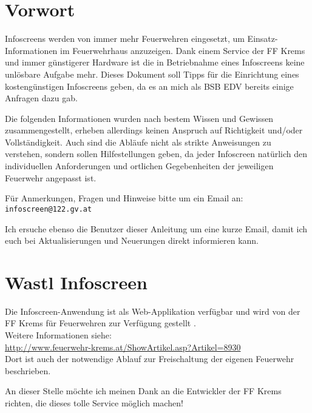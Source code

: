 \section{Vorwort}
Infoscreens werden von immer mehr Feuerwehren eingesetzt, um Einsatz-Informationen im Feuerwehrhaus anzuzeigen.
Dank einem Service der FF Krems \cite{wastl} und immer günstigerer Hardware ist die in Betriebnahme eines Infoscreens keine unlösbare Aufgabe mehr.
Dieses Dokument soll Tipps für die Einrichtung eines kostengünstigen Infoscreens geben, da es an mich als BSB EDV bereits einige Anfragen dazu gab.

Die folgenden Informationen wurden nach bestem Wissen und Gewissen zusammengestellt, erheben allerdings keinen Anspruch auf Richtigkeit und/oder Vollständigkeit.
Auch sind die Abläufe nicht als strikte Anweisungen zu verstehen, sondern sollen Hilfestellungen geben, 
da jeder Infoscreen natürlich den individuellen Anforderungen und ortlichen Gegebenheiten der jeweiligen Feuerwehr angepasst ist.

Für Anmerkungen, Fragen und Hinweise bitte um ein Email an: \verb|infoscreen@122.gv.at|

Ich ersuche ebenso die Benutzer dieser Anleitung um eine kurze Email, damit ich euch bei Aktualisierungen und Neuerungen direkt informieren kann.

\section{Wastl Infoscreen}
\label{sec:wastl}
Die Infoscreen-Anwendung ist als Web-Applikation verfügbar und wird von der FF Krems für Feuerwehren zur Verfügung gestellt \cite{wastl}.\\
Weitere Informationen siehe:\\
\url{http://www.feuerwehr-krems.at/ShowArtikel.asp?Artikel=8930}\\
Dort ist auch der notwendige Ablauf zur Freischaltung der eigenen Feuerwehr beschrieben.

An dieser Stelle möchte ich meinen Dank an die Entwickler der FF Krems richten, die dieses tolle Service möglich machen!


